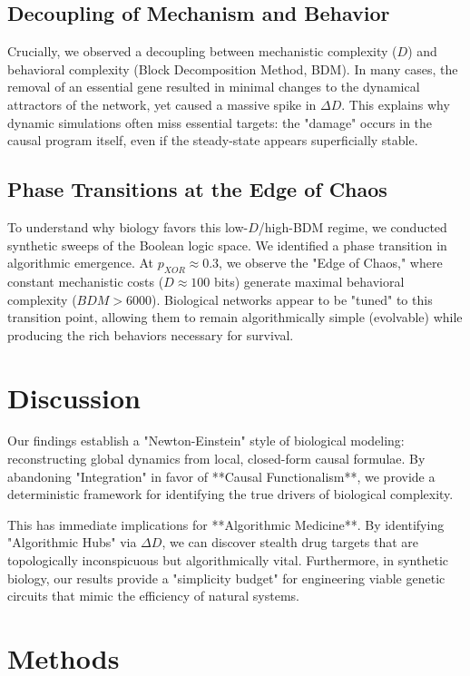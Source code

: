 \documentclass{nature}
\begin{document}
\subsection*{Decoupling of Mechanism and Behavior}
Crucially, we observed a decoupling between mechanistic complexity ($D$) and behavioral complexity (Block Decomposition Method, BDM). In many cases, the removal of an essential gene resulted in minimal changes to the dynamical attractors of the network, yet caused a massive spike in $\Delta D$. This explains why dynamic simulations often miss essential targets: the "damage" occurs in the causal program itself, even if the steady-state appears superficially stable.

\subsection*{Phase Transitions at the Edge of Chaos}
To understand why biology favors this low-$D$/high-BDM regime, we conducted synthetic sweeps of the Boolean logic space. We identified a phase transition in algorithmic emergence. At $p_{XOR} \approx 0.3$, we observe the "Edge of Chaos," where constant mechanistic costs ($D \approx 100$ bits) generate maximal behavioral complexity ($BDM > 6000$). Biological networks appear to be "tuned" to this transition point, allowing them to remain algorithmically simple (evolvable) while producing the rich behaviors necessary for survival.



\section*{Discussion}
Our findings establish a "Newton-Einstein" style of biological modeling: reconstructing global dynamics from local, closed-form causal formulae. By abandoning "Integration" in favor of **Causal Functionalism**, we provide a deterministic framework for identifying the true drivers of biological complexity.

This has immediate implications for **Algorithmic Medicine**. By identifying "Algorithmic Hubs" via $\Delta D$, we can discover stealth drug targets that are topologically inconspicuous but algorithmically vital. Furthermore, in synthetic biology, our results provide a "simplicity budget" for engineering viable genetic circuits that mimic the efficiency of natural systems.

\section*{Methods}
\end{document}
